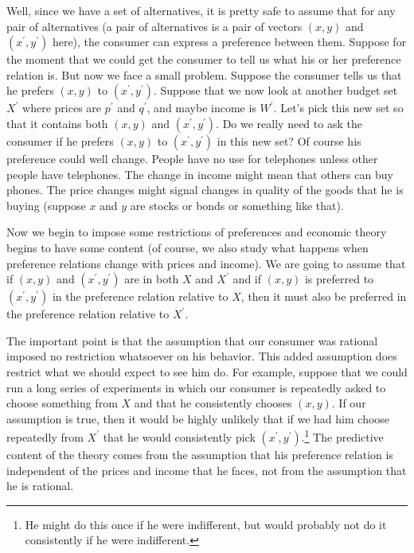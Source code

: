 \documentclass[12pt]{article}
\begin{document}
Well, since we have a set of alternatives, it is pretty safe to assume that
for any pair of alternatives (a pair of alternatives is a pair of vectors
$\left(  x,y\right)  $ and $\left(  x^{\prime},y^{\prime}\right)  $ here), the
consumer can express a preference between them. Suppose for the moment that we
could get the consumer to tell us what his or her preference relation is. But
now we face a small problem. Suppose the consumer tells us that he prefers
$\left(  x,y\right)  $ to $\left(  x^{\prime},y^{\prime}\right)  $. Suppose
that we now look at another budget set $X^{\prime}$ where prices are
$p^{\prime}$ and $q^{\prime}$, and maybe income is $W^{\prime}$. Let's pick
this new set so that it contains both $\left(  x,y\right)  $ and $\left(
x^{\prime},y^{\prime}\right)  $. Do we really need to ask the consumer if he
prefers $\left(  x,y\right)  $ to $\left(  x^{\prime},y^{\prime}\right)  $ in
this new set? Of course his preference could well change. People have no use
for telephones unless other people have telephones. The change in income might
mean that others can buy phones. The price changes might signal changes in
quality of the goods that he is buying (suppose $x$ and $y$ are stocks or
bonds or something like that).

Now we begin to impose some restrictions of preferences and economic theory
begins to have some content (of course, we also study what happens when
preference relations change with prices and income). We are going to assume
that if $\left(  x,y\right)  $ and $\left(  x^{\prime},y^{\prime}\right)  $
are in both $X$ and $X^{\prime}$ and if $\left(  x,y\right)  $ is preferred to
$\left(  x^{\prime},y^{\prime}\right)  $ in the preference relation relative
to $X$, then it must also be preferred in the preference relation relative to
$X^{\prime}$.

The important point is that the assumption that our consumer was rational
imposed no restriction whatsoever on his behavior. This added assumption does
restrict what we should expect to see him do. For example, suppose that we
could run a long series of experiments in which our consumer is repeatedly
asked to choose something from $X$ and that he consistently chooses $\left(
x,y\right)  $. If our assumption is true, then it would be highly unlikely
that if we had him choose repeatedly from $X^{\prime}$ that he would
consistently pick $\left(  x^{\prime},y^{\prime}\right)  $.\footnote{He might
do this once if he were indifferent, but would probably not do it consistently
if he were indifferent.} The predictive content of the theory comes from the
assumption that his preference relation is independent of the prices and
income that he faces, not from the assumption that he is rational.
\end{document}
